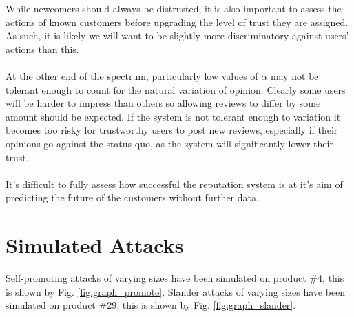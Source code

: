 \documentclass{article}
\begin{document}
While newcomers should always be distrusted\cite{reputation_systems}, it is also important to assess the actions of known customers before upgrading the level of trust they are assigned. As such, it is likely we will want to be slightly more discriminatory against users' actions than this.
\\\\
At the other end of the spectrum, particularly low values of $\alpha$ may not be tolerant enough to count for the natural variation of opinion. Clearly some users will be harder to impress than others so allowing reviews to differ by some amount should be expected. If the system is not tolerant enough to variation it becomes too risky for trustworthy users to post new reviews\cite{survey_and_taxonomy}, especially if their opinions go against the status quo, as the system will significantly lower their trust.
\\\\
It's difficult to fully assess how successful the reputation system is at it's aim of predicting the future of the customers without further data.

\section{Simulated Attacks} %
\label{attacks}
Self-promoting attacks of varying sizes have been simulated on product \#4, this is shown by Fig. \ref{fig:graph_promote}.
Slander attacks of varying sizes have been simulated on product \#29, this is shown by Fig. \ref{fig:graph_slander}.
\end{document}

